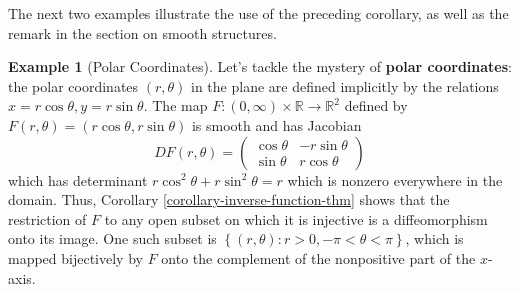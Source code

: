 \documentclass[reqno]{amsart}
\theoremstyle{plain}%
\theoremstyle{definition}
\newtheorem{example}[theorem]{Example}
\theoremstyle{remark}
\begin{document}
        The next two examples illustrate the use of the preceding corollary, as well
        as the remark in the section on smooth structures.

        \begin{example}[Polar Coordinates]
          Let's tackle the mystery of \textbf{polar coordinates}: the polar
          coordinates $(r, \theta)$ in the plane are defined implicitly by the
          relations $x = r \cos \theta, y = r \sin \theta$. The map
          $F  \colon \left( 0, \infty \right) \times \mathbb{R} \to 
          \mathbb{R}^2$ defined by $F\left( r, \theta \right) =
          \left( r \cos \theta, r \sin \theta \right) $ is smooth and has
          Jacobian
          \[
          DF(r,\theta) = \begin{pmatrix} 
              \cos \theta & - r \sin \theta\\
              \sin \theta & r \cos \theta
          \end{pmatrix} 
          \] 
          which has determinant $r \cos^2 \theta + r \sin^2 \theta = r$ which is
          nonzero everywhere in the domain. Thus, Corollary
          \ref{corollary-inverse-function-thm} shows that the restriction of $F$ to
          any open subset on which it is injective is a diffeomorphism onto its
          image. One such subset is $\left\{ \left( r, \theta \right)  \colon
          r >0, - \pi < \theta < \pi \right\} $, which is mapped bijectively by $F$ 
          onto the complement of the nonpositive part of the $x$-axis.
        \end{example}
\end{document}
